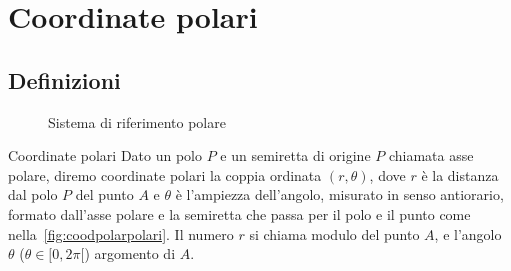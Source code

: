 \chapter{Coordinate polari}
\section{Definizioni}
\label{Cha:CoordinatePolariTrig}
\begin{figure} %
	\centering
	
	\caption{Sistema di riferimento polare}\label{fig:coodpolarpolari}
\end{figure}
\begin{definizionet}{Coordinate polari}{}
Dato un polo $P$ e un semiretta di origine $P$ chiamata asse polare, diremo coordinate polari la coppia ordinata $(r,\theta)$, dove $r$ è la distanza dal polo $P$ del punto $A$ e $\theta$ è l'ampiezza dell'angolo, misurato in senso antiorario, formato dall'asse polare e la semiretta che passa per il polo e il punto come nella~\vref{fig:coodpolarpolari}. Il numero $r$ si chiama modulo del punto $A$, e l'angolo $\theta$ ($\theta\in[0,2\pi[$) argomento di $A$. 
\end{definizionet}
